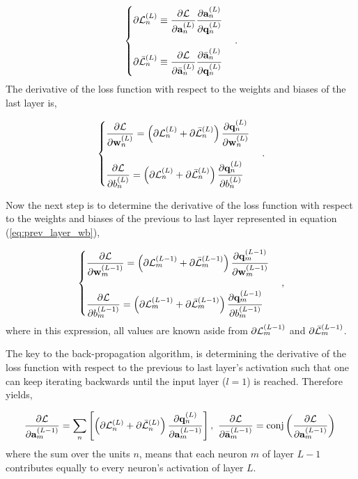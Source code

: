 \begin{equation}
	\begin{cases}
		\partial\mathcal{L}^{(L)}_{n} \equiv \dfrac{\partial \mathcal{L}}{\partial \mathbf{a}^{(L)}_{n}}\dfrac{\partial \mathbf{a}^{(L)}_{n}}{\partial \mathbf{q}^{(L)}_{n}} \\
		\\
		\partial\bar{\mathcal{L}}^{(L)}_{n} \equiv \dfrac{\partial \mathcal{L}}{\partial \bar{\mathbf{a}}^{(L)}_{n}}\dfrac{\partial \bar{\mathbf{a}}^{(L)}_{n}}{\partial \mathbf{q}^{(L)}_{n}} \\
	\end{cases}.
	\label{eq:lossdef}
\end{equation}
The derivative of the loss function with respect to the weights and biases of the last layer is,

\begin{equation}
	\begin{cases}
		\dfrac{\partial \mathcal{L}}{\partial \mathbf{w}^{(L)}_{n}} = \left( \partial\mathcal{L}^{(L)}_{n}+ \partial\bar{\mathcal{L}}^{(L)}_{n} \right)\dfrac{\partial \mathbf{q}^{(L)}_{n}}{\partial \mathbf{w}^{(L)}_{n}} \\
		\\
		\dfrac{\partial \mathcal{L}}{\partial b^{(L)}_{n}} = \left( \partial\mathcal{L}^{(L)}_{n} + \partial\bar{\mathcal{L}}^{(L)}_{n} \right)\dfrac{\partial \mathbf{q}^{(L)}_{n}}{\partial b^{(L)}_{n}} \\
	\end{cases}.
\end{equation}

Now the next step is to determine the derivative of the loss function with respect to the weights and biases of the previous to last layer represented in equation (\ref{eq:prev_layer_wb}),

\begin{equation}
	\begin{cases}
		\dfrac{\partial \mathcal{L}}{\partial \mathbf{w}^{(L-1)}_{m}} = \left( \partial\mathcal{L}^{(L-1)}_{m} + \partial\bar{\mathcal{L}}^{(L-1)}_{m} \right)\dfrac{\partial \mathbf{q}^{(L-1)}_{m}}{\partial \mathbf{w}^{(L-1)}_{m}} \\
		\\
		\dfrac{\partial \mathcal{L}}{\partial b^{(L-1)}_{m}} = \left( \partial\mathcal{L}^{(L-1)}_{m} + \partial\bar{\mathcal{L}}^{(L-1)}_{m} \right)\dfrac{\partial \mathbf{q}^{(L-1)}_{m}}{\partial b^{(L-1)}_{m}} \\
	\end{cases},
	\label{eq:prev_layer_wb}
\end{equation}
where in this expression,  all values are known aside from $ \partial\mathcal{L}^{(L-1)}_{m} $ and $ \partial\bar{\mathcal{L}}^{(L-1)}_{m} $.

The key to the back-propagation algorithm, is determining the derivative of the loss function with respect to the previous to last layer's activation such that one can keep iterating backwards until the input layer ($ l = 1 $) is reached. Therefore yields,

\begin{equation}
	\dfrac{\partial \mathcal{L}}{\partial \mathbf{a}^{(L-1)}_{m}} = \sum_{n} \left[ \left( \partial\mathcal{L}^{(L)}_{n} + \partial\bar{\mathcal{L}}^{(L)}_{n} \right)\dfrac{\partial \mathbf{q}^{(L)}_{n}}{\partial \mathbf{a}^{(L-1)}_{m}} \right],
	\
	\dfrac{\partial \mathcal{L}}{\partial \bar{\mathbf{a}}^{(L-1)}_{m}} =  \text{conj}\left( \dfrac{\partial \mathcal{L}}{\partial \mathbf{a}^{(L-1)}_{m}} \right) \\
	\label{eq:back_prop}
\end{equation}
where the sum over the units $ n $, means that each neuron $ m $ of layer $ L-1 $ contributes equally to every neuron's activation of layer $ L $.

